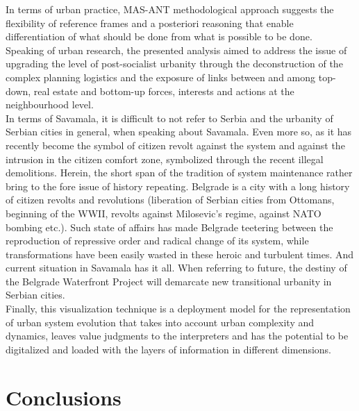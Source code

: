 \documentclass[11pt]{report}
\begin{document}
{In terms of urban practice, MAS-ANT methodological approach suggests the flexibility of reference frames and a posteriori reasoning that enable differentiation of what should be done from what is possible to be done.
\\

Speaking of urban research, the presented analysis aimed to address the issue of upgrading the level of post-socialist urbanity through the deconstruction of the complex planning logistics and the exposure of links between and among top-down, real estate and bottom-up forces, interests and actions at the neighbourhood level.
\\
 
In terms of Savamala, it is difficult to not refer to Serbia and the urbanity of Serbian cities in general, when speaking about Savamala. Even more so, as it has recently become the symbol of citizen revolt against the system and against the intrusion in the citizen comfort zone, symbolized through the recent illegal demolitions. 
Herein, the short span of the tradition of system maintenance rather bring to the fore issue of history repeating. Belgrade is a city with a long history of citizen revolts and revolutions (liberation of Serbian cities from Ottomans, beginning of the WWII, revolts against Milosevic's regime, against NATO bombing etc.).
Such state of affairs has made Belgrade teetering between the reproduction of repressive order and radical change of its system, while transformations have been easily wasted in these heroic and turbulent times.
And current situation in Savamala has it all.
When referring to future, the destiny of the Belgrade Waterfront Project will demarcate new transitional urbanity in Serbian cities.
\\

Finally, this visualization technique is a deployment model for the representation of urban system evolution that takes into account urban complexity and dynamics, leaves value judgments to the interpreters and has the potential to be digitalized and loaded with the layers of information in different dimensions.


\chapter{Conclusions}


}
\end{document}
